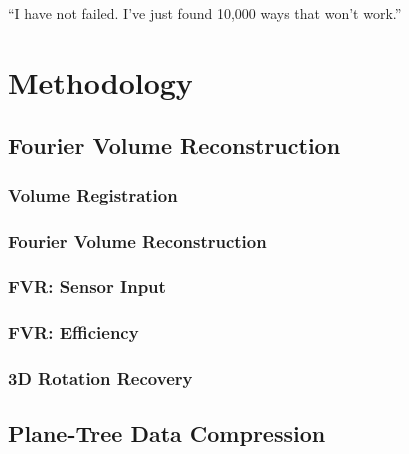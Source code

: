 \begin{savequote}[8cm]
  ``I have not failed. I've just found 10,000 ways that won't work.''
\end{savequote}
\makeatletter
\chapter{Methodology}


\section{Fourier Volume Reconstruction}
\label{FVRSectionA}


\subsection{Volume Registration} \label{Sec:VolumeRegistrationSection}


\subsection{Fourier Volume Reconstruction} \label{Sec:AFVRApproach}


\subsection{FVR: Sensor Input} 
\label{Sec:AMonoFVRApproach}


\subsection{FVR: Efficiency} \label{Sec:Efficiency}


\subsection{3D Rotation Recovery}




\section{Plane-Tree Data Compression}

